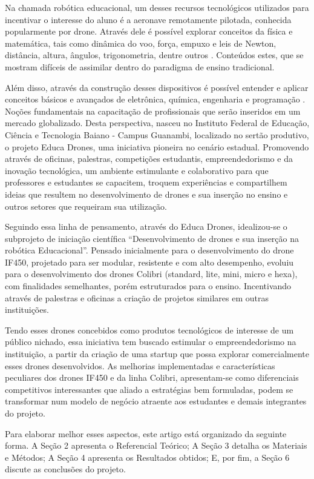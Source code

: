 \documentclass[conference]{IEEEtran}
\begin{document}
Na chamada robótica educacional, um desses recursos tecnológicos  utilizados para incentivar o interesse do aluno é a aeronave remotamente pilotada, conhecida popularmente por drone. Através dele é possível explorar conceitos da física e matemática, tais como dinâmica do voo, força, empuxo e leis de Newton, distância, altura, ângulos, trigonometria, dentre outros \cite{b11}. Conteúdos estes, que se mostram difíceis de assimilar dentro do paradigma de ensino tradicional.

Além disso, através da construção desses dispositivos é possível entender e aplicar conceitos básicos e avançados de eletrônica, química, engenharia e programação \cite{b12}. Noções fundamentais na capacitação de profissionais que serão inseridos em um mercado globalizado. Desta perspectiva, nasceu no Instituto Federal de Educação, Ciência e Tecnologia Baiano - Campus Guanambi, localizado no sertão produtivo, o projeto Educa Drones, uma iniciativa pioneira no cenário estadual. Promovendo através de oficinas, palestras, competições estudantis, empreendedorismo e da inovação tecnológica, um ambiente estimulante e colaborativo para que professores e estudantes se capacitem, troquem experiências e comparti\-lhem ideias que resultem no desenvolvimento de drones e sua inserção no ensino e outros setores que requeiram sua utilização.

Seguindo essa linha de pensamento, através do Educa Drones, idealizou-se o subprojeto de iniciação científica “Desenvolvimento de drones e sua inserção na robótica Educacional”. Pensado inicialmente para o desenvolvimento do drone IF450, projetado para ser modular, resistente  e com alto desempenho, evoluiu para o desenvolvimento dos drones Colibri (standard, lite, mini, micro e hexa), com finalidades semelhantes, porém estruturados para o ensino. Incentivando através de palestras e oficinas a criação de projetos similares em outras instituições.

Tendo esses drones concebidos como produtos tecnológicos de interesse de um público nichado, essa iniciativa tem buscado estimular o empreendedorismo na instituição, a partir da criação de uma startup que possa explorar comercialmente esses drones desenvolvidos. As melhorias implementadas e características peculiares dos drones IF450 e da linha Colibri, apresentam-se como diferenciais competitivos interessantes que aliado a estratégias bem formuladas, podem se transformar num modelo de negócio atraente aos estudantes e demais integrantes do projeto. 

Para elaborar melhor esses aspectos, este artigo está organizado da seguinte forma. A Seção 2 apresenta o Referencial Teórico; A Seção 3 detalha os Materiais e Métodos; A Seção 4 apresenta os Resultados obtidos; E, por fim, a Seção 6 discute as conclusões do projeto.
\end{document}

